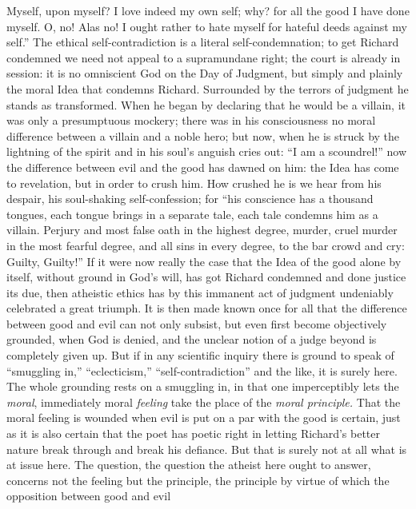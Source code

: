 \documentclass[12pt,a4paper,openany]{book}
\newcommand{\opage}[1]{\marginnote{\footnotesize\textit{[#1]}}}
\begin{document}
Myself, upon myself? I love indeed my own self; why?
for all the good I have done myself. O, no!
Alas no! I ought rather to hate myself for hateful deeds against
my self.'' The ethical self-contradiction is a literal
self-condemnation; to get Richard condemned we need not
appeal to a supramundane right; the court is already in session:
it is no omniscient God on the Day of Judgment, but
simply and plainly the moral Idea that condemns Richard.
Surrounded by the terrors of judgment he stands as transformed.
When he began by declaring that he would
be a villain, it was only a presumptuous mockery; there
was in his consciousness no moral difference between a
villain and a noble hero; but now, when he is struck by
the lightning of the spirit and in his soul's anguish cries out: ``I am a
scoundrel!'' now the difference between evil and the
good has dawned on him: the Idea has come to revelation,
but in order to crush him. How crushed he
is we hear from his despair, his soul-shaking
self-confession; for ``his conscience has a thousand tongues,
each tongue brings in a separate tale, each
tale condemns him as a villain. Perjury and most false
oath in the highest degree, murder, cruel murder in the most fearful
degree, and all sins in every degree, to the bar
crowd and cry: Guilty, Guilty!''
If it were now really the case that the
\setcounter{footnote}{0}%
\opage{546}Idea of the good alone by itself, without ground in God's will,
has got Richard condemned and done justice its due,
then atheistic ethics has by this immanent
act of judgment undeniably celebrated a great triumph. It is then
made known once for all that the difference between
good and evil can not only subsist, but even first
become objectively grounded, when God is denied, and
the unclear notion of a judge beyond is completely
given up. But if in any scientific
inquiry there is ground to speak of ``smuggling in,'' ``eclecticism,''
``self-contradiction'' and the like, it is surely here.
The whole grounding rests on a smuggling in, in that
one imperceptibly lets the \emph{moral}, immediately moral
\emph{feeling} take the place of the \emph{moral principle.}
That the moral feeling is wounded when evil is put on a par
with the good is certain, just as it is also certain that
the poet has poetic right in letting Richard's better
nature break through and break his defiance.
But that is surely not at all what is at issue here. The question,
the question the atheist here ought to answer,
concerns not the feeling but the principle, the principle by
virtue of which the opposition between good and evil
\end{document}
